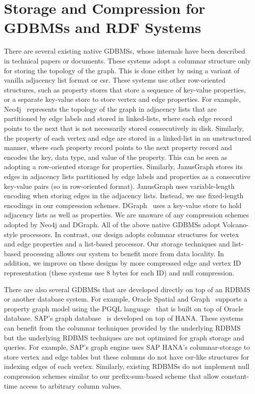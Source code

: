 \section{Storage and Compression for GDBMSs and RDF Systems}
\label{sec:gdbms-storage-and-compression}

There are several existing native GDBMSs, whose internals have been described in technical papers or documents. These systems adopt a columnar structure only for storing the topology of the graph. This is done either by using a variant of vanilla adjacency list format or \gls{csr}. These systems use other row-oriented structures, such as property stores that store a sequence of key-value properties, or a separate key-value store to store vertex and edge properties. For example, Neo4j~\cite{neo4j} represents the topology of the graph in adjacency lists that are partitioned by edge labels and stored in linked-lists, where each edge record points to the next that is not necessarily stored consecutively in disk. Similarly, the property of each vertex and edge are stored in a linked-list in an unstructured manner, where each property record points to the next property record and encodes the key, data type, and value of the property. This can be seen as adopting a row-oriented storage for properties. Similarly, JanusGraph \cite{janusgraph} stores its edges in adjacency lists partitioned by edge labels and properties as a consecutive key-value pairs (so in row-oriented format). JanusGraph uses variable-length encoding when storing edges in the adjacency lists. Instead, we use fixed-length encodings in our compression schemes. DGraph~\cite{dgraph} uses a key-value store to hold adjacency lists as well as properties.  We are unaware of any compression schemes adopted by Neo4j and DGraph. All of the above native GDBMSs adopt Volcano-style processors. In contrast, our design adopts columnar structures for vertex and edge properties and a list-based processor. Our storage techniques and list-based processing allows our system to benefit more from data locality. In addition, we improve on these designs by more compressed edge and vertex ID representation (these systems use 8 bytes for each ID) and null compression.

There are also several GDBMSs that are developed directly on top of an RDBMS or another database system. For example, Oracle Spatial and Graph~\cite{oracle} supports a property graph model using the PGQL language~\cite{pgql} that is built on top of Oracle database. SAP's graph database~\cite{hana-graph} is developed on top of HANA. These systems can benefit from the columnar techniques provided by the underlying RDBMS but the underlying RDBMS techniques are not optimized for graph storage and queries. For example, SAP's graph engine uses SAP HANA's columnar-storage to store vertex and edge tables but these columns do not have \gls{csr}-like structures for indexing edges of each vertex. Similarly, existing RDBMSs do not implement null compression schemes similar to our prefix-sum-based scheme that allow constant-time access to arbitrary column values.

